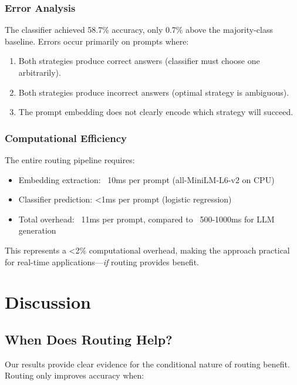 \documentclass[11pt,letterpaper]{article}
\begin{document}
\subsubsection{Error Analysis}

The classifier achieved 58.7\% accuracy, only 0.7\% above the majority-class baseline. Errors occur primarily on prompts where:
\begin{enumerate}
    \item Both strategies produce correct answers (classifier must choose one arbitrarily).
    \item Both strategies produce incorrect answers (optimal strategy is ambiguous).
    \item The prompt embedding does not clearly encode which strategy will succeed.
\end{enumerate}

\subsubsection{Computational Efficiency}

The entire routing pipeline requires:
\begin{itemize}
    \item Embedding extraction: ~10ms per prompt (all-MiniLM-L6-v2 on CPU)
    \item Classifier prediction: <1ms per prompt (logistic regression)
    \item Total overhead: ~11ms per prompt, compared to ~500-1000ms for LLM generation
\end{itemize}

This represents a <2\% computational overhead, making the approach practical for real-time applications---\textit{if} routing provides benefit.

\section{Discussion}

\subsection{When Does Routing Help?}

Our results provide clear evidence for the conditional nature of routing benefit. Routing only improves accuracy when:
\end{document}
